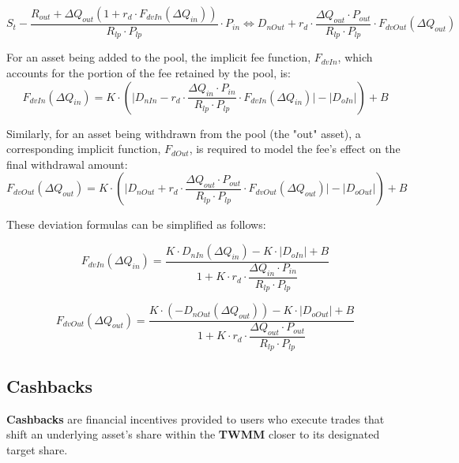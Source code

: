 \begin{equation}
	\label{eq:deviation_out_to_cashback_explanation}
	S_t - \frac{R_{out} + \Delta Q_{out} (1 + r_d \cdot F_{dvIn}(\Delta Q_{in}))}{R_{lp} \cdot P_{lp}}  \cdot P_{in} \iff D_{nOut}  + r_{d} \cdot \frac{\Delta Q_{out} \cdot P_{out} }{R_{lp} \cdot P_{lp}} \cdot F_{dvOut}(\Delta Q_{out})
\end{equation}

For an asset being added to the pool, the implicit fee function, $F_{dvIn}$, which accounts for the portion of the fee retained by the pool, is:
\begin{equation}
	\label{eq:deviation_in_function}
	F_{dvIn}(\Delta Q_{in}) = K \cdot (\lvert D_{nIn} - r_{d} \cdot \frac{\Delta Q_{in} \cdot P_{in} }{R_{lp} \cdot P_{lp}} \cdot F_{dvIn}(\Delta Q_{in}) \rvert - \lvert D_{oIn} \rvert) + B  
\end{equation}

Similarly, for an asset being withdrawn from the pool (the "out" asset), a corresponding implicit function, $F_{dOut}$, is required to model the fee's effect on the final withdrawal amount:
\begin{equation}
	\label{eq:deviation_out_function}
	F_{dvOut}(\Delta Q_{out}) = K \cdot (\lvert D_{nOut}  + r_{d} \cdot \frac{\Delta Q_{out} \cdot P_{out} }{R_{lp} \cdot P_{lp}} \cdot F_{dvOut}(\Delta Q_{out}) \rvert - \lvert D_{oOut} \rvert) + B 
\end{equation}


These deviation formulas can be simplified as follows:

\begin{equation}
	\label{eq:deviation_in_function_simplified_final}
	F_{dvIn}(\Delta Q_{in}) = \dfrac{K \cdot D_{nIn}(\Delta Q_{in}) - K \cdot \lvert D_{oIn} \rvert + B}{1 + K \cdot r_d \cdot \dfrac{\Delta Q_{in} \cdot P_{in}}{R_{lp} \cdot P_{lp}}}
\end{equation}

\begin{equation}
	\label{eq:deviation_out_function_simplified_final}
	F_{dvOut}(\Delta Q_{out}) = \dfrac{K \cdot (-D_{nOut}(\Delta Q_{out})) - K \cdot \lvert D_{oOut} \rvert + B}{1 + K \cdot r_d \cdot \dfrac{\Delta Q_{out} \cdot P_{out}}{R_{lp} \cdot P_{lp}}}
\end{equation}


\subsection{Cashbacks}
\textbf{Cashbacks} are financial incentives provided to users who execute trades that shift an underlying asset's share within the \textbf{TWMM} closer to its designated target share.


